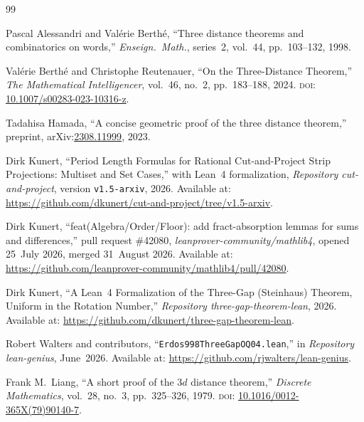 \documentclass[11pt,reqno]{amsart}
\theoremstyle{plain}
\theoremstyle{definition}
\theoremstyle{remark}
\newcommand{\code}[1]{\texttt{#1}}
\begin{document}
\begin{thebibliography}{99}

Pascal Alessandri and Val\'{e}rie Berth\'{e},
``Three distance theorems and combinatorics on words,''
\emph{Enseign.\ Math.}, series~2, vol.~44, pp.~103--132, 1998.

Val\'{e}rie Berth\'{e} and Christophe Reutenauer,
``On the Three-Distance Theorem,''
\emph{The Mathematical Intelligencer}, vol.~46, no.~2, pp.~183--188, 2024.
\textsc{doi}: \href{https://doi.org/10.1007/s00283-023-10316-z}%
{10.1007/s00283-023-10316-z}.

Tadahisa Hamada,
``A concise geometric proof of the three distance theorem,''
preprint, arXiv:\href{https://arxiv.org/abs/2308.11999}{2308.11999}, 2023.

Dirk Kunert,
``Period Length Formulas for Rational Cut-and-Project Strip Projections:
Multiset and Set Cases,'' with Lean~4 formalization,
\emph{Repository cut-and-project}, version \texttt{v1.5-arxiv}, 2026.\newline
Available at: \url{https://github.com/dkunert/cut-and-project/tree/v1.5-arxiv}.

Dirk Kunert,
``feat(Algebra/Order/Floor): add fract-absorption lemmas for sums and
differences,''
pull request \#42080, \emph{leanprover-community/mathlib4}, opened 25~July
2026, merged 31~August 2026.\newline
Available at:
\url{https://github.com/leanprover-community/mathlib4/pull/42080}.

Dirk Kunert,
``A Lean~4 Formalization of the Three-Gap (Steinhaus) Theorem, Uniform in the
Rotation Number,''
\emph{Repository three-gap-theorem-lean}, 2026.\newline
Available at: \url{https://github.com/dkunert/three-gap-theorem-lean}.

Robert Walters and contributors,
``\code{Erdos998ThreeGapOQ04.lean},'' in
\emph{Repository lean-genius}, June~2026.\newline
Available at: \url{https://github.com/rjwalters/lean-genius}.

Frank M.\ Liang,
``A short proof of the $3d$ distance theorem,''
\emph{Discrete Mathematics}, vol.~28, no.~3, pp.~325--326, 1979.
\textsc{doi}: \href{https://doi.org/10.1016/0012-365X(79)90140-7}%
{10.1016/0012-365X(79)90140-7}.


\end{thebibliography}
\end{document}
